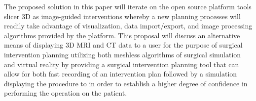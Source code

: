 The proposed solution in this paper will iterate on the open source platform tools slicer 3D as image-guided interventions whereby a new planning processes will readily take advantage of visualization, data import/export, and image processing algorithms \cite{Ungi2016} provided by the platform. This proposal will discuss an alternative means of displaying 3D MRI and CT data to a user for the purpose of surgical intervention planning utilizing both meshless algorithms of surgical simulation and virtual reality by providing a surgical intervention planning tool that can allow for both fast recording of an intervention plan followed by a simulation displaying the procedure to in order to establish a higher degree of confidence in performing the operation on the patient.


